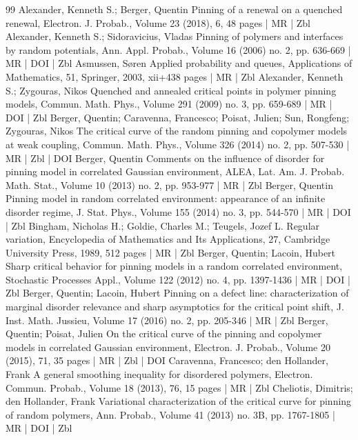\documentclass[10pt]{amsart}
\theoremstyle{definition}\newtheorem{defi}[theo]{Definition}\newtheorem{rema}[theo]{Remark}\newtheorem{exam}[theo]{Example}\newtheorem{exem}[theo]{Example}\newtheorem{nota}[theo]{Notation}
\begin{document}
\begin{thebibliography}{99}
Alexander, Kenneth S.; Berger, Quentin Pinning of a renewal on a quenched renewal, Electron. J. Probab., Volume 23 (2018), 6, 48 pages | MR | Zbl
Alexander, Kenneth S.; Sidoravicius, Vladas Pinning of polymers and interfaces by random potentials, Ann. Appl. Probab., Volume 16 (2006) no. 2, pp. 636-669 | MR | DOI | Zbl
Asmussen, Søren Applied probability and queues, Applications of Mathematics, 51, Springer, 2003, xii+438 pages | MR | Zbl
Alexander, Kenneth S.; Zygouras, Nikos Quenched and annealed critical points in polymer pinning models, Commun. Math. Phys., Volume 291 (2009) no. 3, pp. 659-689 | MR | DOI | Zbl
Berger, Quentin; Caravenna, Francesco; Poisat, Julien; Sun, Rongfeng; Zygouras, Nikos The critical curve of the random pinning and copolymer models at weak coupling, Commun. Math. Phys., Volume 326 (2014) no. 2, pp. 507-530 | MR | Zbl | DOI
Berger, Quentin Comments on the influence of disorder for pinning model in correlated Gaussian environment, ALEA, Lat. Am. J. Probab. Math. Stat., Volume 10 (2013) no. 2, pp. 953-977 | MR | Zbl
Berger, Quentin Pinning model in random correlated environment: appearance of an infinite disorder regime, J. Stat. Phys., Volume 155 (2014) no. 3, pp. 544-570 | MR | DOI | Zbl
Bingham, Nicholas H.; Goldie, Charles M.; Teugels, Jozef L. Regular variation, Encyclopedia of Mathematics and Its Applications, 27, Cambridge University Press, 1989, 512 pages | MR | Zbl
Berger, Quentin; Lacoin, Hubert Sharp critical behavior for pinning models in a random correlated environment, Stochastic Processes Appl., Volume 122 (2012) no. 4, pp. 1397-1436 | MR | DOI | Zbl
Berger, Quentin; Lacoin, Hubert Pinning on a defect line: characterization of marginal disorder relevance and sharp asymptotics for the critical point shift, J. Inst. Math. Jussieu, Volume 17 (2016) no. 2, pp. 205-346 | MR | Zbl
Berger, Quentin; Poisat, Julien On the critical curve of the pinning and copolymer models in correlated Gaussian environment, Electron. J. Probab., Volume 20 (2015), 71, 35 pages | MR | Zbl | DOI
Caravenna, Francesco; den Hollander, Frank A general smoothing inequality for disordered polymers, Electron. Commun. Probab., Volume 18 (2013), 76, 15 pages | MR | Zbl
Cheliotis, Dimitris; den Hollander, Frank Variational characterization of the critical curve for pinning of random polymers, Ann. Probab., Volume 41 (2013) no. 3B, pp. 1767-1805 | MR | DOI | Zbl

\end{thebibliography}
\end{document}
